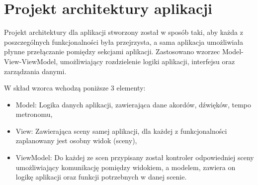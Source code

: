 


\section{Projekt architektury aplikacji}

Projekt architektury dla aplikacji stworzony został w sposób taki, aby każda z poszczególnych funkcjonalności była przejrzysta, a sama aplikacja umożliwiała płynne przełączanie pomiędzy sekcjami aplikacji. Zastosowano wzorzec Model-View-ViewModel, umożliwiający rozdzielenie logiki aplikacji, interfejsu oraz zarządzania danymi. 


W skład wzorca wchodzą poniższe 3 elementy:
\begin{itemize}
	\item Model: Logika danych aplikacji, zawierająca dane akordów, dźwięków, tempo metronomu,
	\item View: Zawierająca sceny samej aplikacji, dla każdej z funkcjonalności zaplanowany jest osobny widok (sceny),
	\item ViewModel: Do każdej ze scen przypisany został kontroler odpowiedniej sceny umożliwiający komunikację pomiędzy widokiem, a modelem, zawiera on logikę aplikacji oraz funkcji potrzebnych w danej scenie.
\end{itemize}

